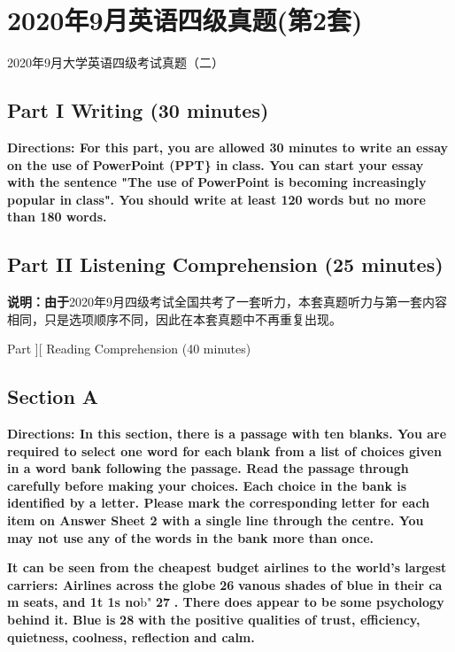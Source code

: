 \documentclass[UTF8,11pt]{ctexart}
\begin{document}
\section*{2020年9月英语四级真题(第2套)}
2020年9月大学英语四级考试真题（二）


\subsection*{Part I Writing (30 minutes)}


\textbf{Directions: For this part, you are allowed 30 minutes to write an essay on the use of PowerPoint (PPT\} in} \textbf{class. You can start your essay with the sentence "The use of PowerPoint is becoming increasingly popular in} \textbf{class". You should write at least 120 words but no more than 180 words.}


\subsection*{Part II Listening Comprehension (25 minutes)}


\textbf{说明：由于}2020年9月四级考试全国共考了一套听力，本套真题听力与第一套内容相同，只是选项顺序不同，因此在本套真题中不再重复出现。


Part ][ Reading Comprehension (40 minutes)


\subsection*{Section A}


\textbf{Directions: In this section, there is a passage with ten blanks. You are required to select one word for each} \textbf{blank from a list of choices given in a word bank following the passage. Read the passage through carefully} \textbf{before making your choices. Each choice in the bank is identified by a letter. Please mark the corresponding} \textbf{letter for each item on Answer Sheet 2 with a single line through the centre. You may not use any of the} \textbf{words in the bank more than once.}


\textbf{It can be seen from the cheapest budget airlines to the world's largest carriers: Airlines across the} \textbf{globe} \textbf{26} \textbf{vanous shades of blue in their ca m seats, and 1t 1s no}b" \textbf{27} \textbf{. There does appear to be} \textbf{some psychology behind it. Blue is} \textbf{28} \textbf{with the positive qualities of trust, efficiency, quietness,} \textbf{coolness, reflection and calm.}
\end{document}
